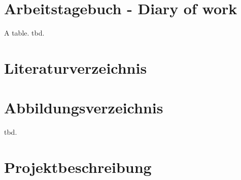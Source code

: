 \documentclass[paper=a4, fontsize=11pt]{scrartcl}
\numberwithin{equation}{section} %
\numberwithin{table}{section} %
\begin{document}
\appendix

\section{Arbeitstagebuch - Diary of work}
A table. tbd.

\section{Literaturverzeichnis}
\printbibliography %

\section{Abbildungsverzeichnis} %
tbd.

\section{Projektbeschreibung}
\lipsum[11] %
\end{document}
